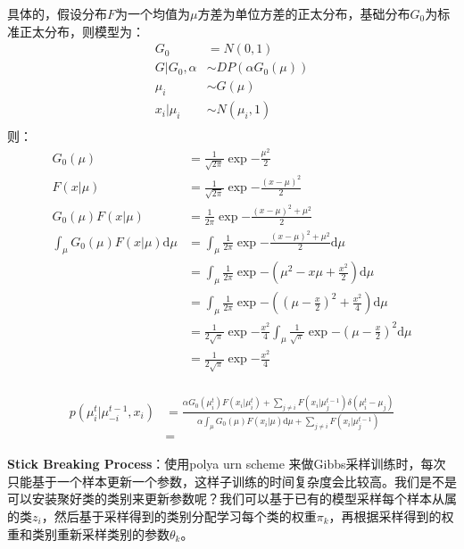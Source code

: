 具体的，假设分布$F$为一个均值为$\mu$方差为单位方差的正太分布，基础分布$G_0$为标准正太分布，则模型为：
\begin{displaymath}
\begin{split}
G_0 &= N(0,1)\\
G|G_0,\alpha &\sim DP(\alpha G_0(\mu))\\
\mu_i &\sim G(\mu)\\
x_i|\mu_i &\sim N(\mu_i, 1)\\
\end{split}
\end{displaymath}
则：
\begin{displaymath}
\begin{split}
G_0(\mu) &= \frac{1}{\sqrt{2\pi}} \exp{-\frac{\mu^2}{2}}\\
F(x|\mu) & = \frac{1}{\sqrt{2\pi}} \exp{-\frac{(x-\mu)^2}{2}}\\
G_0(\mu)F(x|\mu) &=  \frac{1}{2\pi} \exp{-\frac{(x-\mu)^2 + \mu^2}{2}}\\
\int_{\mu} G_0(\mu)F(x|\mu) \mathrm{d} \mu &= \int_{\mu}  \frac{1}{2\pi} \exp{-\frac{(x-\mu)^2 + \mu^2}{2}} \mathrm{d} \mu \\
&=  \int_{\mu} \frac{1}{2\pi} \exp{-(\mu^2-x\mu + \frac{x^2}{2})}  \mathrm{d} \mu \\
&=  \int_{\mu} \frac{1}{2\pi} \exp{-((\mu-\frac{x}{2})^2 + \frac{x^2}{4})}  \mathrm{d} \mu \\
&= \frac{1}{2\sqrt{\pi}} \exp{-\frac{x^2}{4}} 
 \int_{\mu} \frac{1}{\sqrt{\pi}} \exp{-(\mu-\frac{x}{2})^2}  \mathrm{d} \mu \\
&= \frac{1}{2\sqrt{\pi}} \exp{-\frac{x^2}{4}} \\
\end{split}
\end{displaymath}

\begin{displaymath}
\begin{split}
p(\mu_i^t | \mu_{-i}^{t-1}, x_i) &=\frac{\alpha G_0(\mu_i^{t})F(x_i|\mu_i^{t}) + \sum_{j \neq i}F(x_i|\mu_j^{t-1}) \delta(\mu_i^t - \mu_j)} {
\alpha \int_{\mu} G_0(\mu)F(x_i|\mu) \mathrm{d} \mu + \sum_{j \neq i}F(x_i|\mu_j^{t-1})
}\\
&= 
\end{split}
\end{displaymath}

\textbf{Stick Breaking Process}：使用polya urn scheme 来做Gibbs采样训练时，每次只能基于一个样本更新一个参数，这样子训练的时间复杂度会比较高。我们是不是可以安装聚好类的类别来更新参数呢？我们可以基于已有的模型采样每个样本从属的类$z_i$，然后基于采样得到的类别分配学习每个类的权重$\pi_k$，再根据采样得到的权重和类别重新采样类别的参数$\theta_k$。


